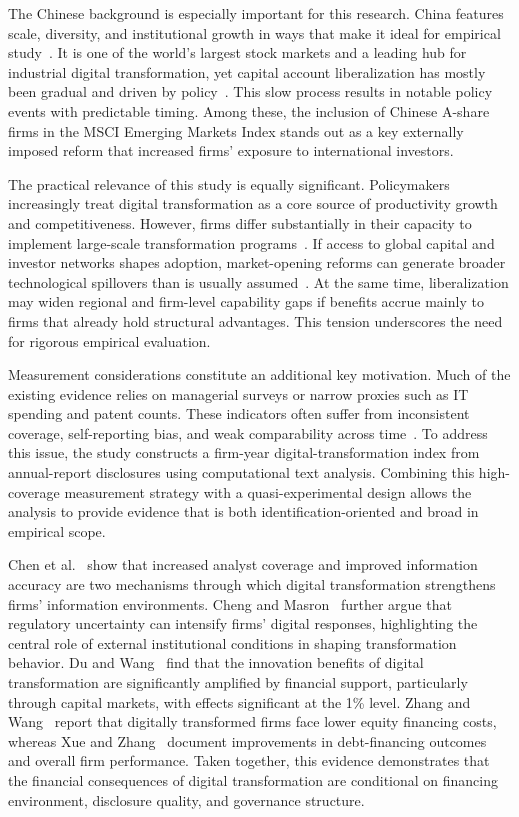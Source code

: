 The Chinese background is especially important for this research. China features scale, diversity, and institutional growth in ways that make it ideal for empirical study~\cite{Allen2017}. It is one of the world's largest stock markets and a leading hub for industrial digital transformation, yet capital account liberalization has mostly been gradual and driven by policy~\cite{PLi2023}. This slow process results in notable policy events with predictable timing. Among these, the inclusion of Chinese A-share firms in the MSCI Emerging Markets Index stands out as a key externally imposed reform that increased firms' exposure to international investors.

The practical relevance of this study is equally significant. Policymakers increasingly treat digital transformation as a core source of productivity growth and competitiveness. However, firms differ substantially in their capacity to implement large-scale transformation programs~\cite{Liu2023}. If access to global capital and investor networks shapes adoption, market-opening reforms can generate broader technological spillovers than is usually assumed~\cite{Zheng2021}. At the same time, liberalization may widen regional and firm-level capability gaps if benefits accrue mainly to firms that already hold structural advantages. This tension underscores the need for rigorous empirical evaluation.

Measurement considerations constitute an additional key motivation. Much of the existing evidence relies on managerial surveys or narrow proxies such as IT spending and patent counts. These indicators often suffer from inconsistent coverage, self-reporting bias, and weak comparability across time~\cite{Wang2022}. To address this issue, the study constructs a firm-year digital-transformation index from annual-report disclosures using computational text analysis. Combining this high-coverage measurement strategy with a quasi-experimental design allows the analysis to provide evidence that is both identification-oriented and broad in empirical scope.

Chen et al.~\cite{Chen2022} show that increased analyst coverage and improved information accuracy are two mechanisms through which digital transformation strengthens firms' information environments. Cheng and Masron~\cite{ChengMasron2023} further argue that regulatory uncertainty can intensify firms' digital responses, highlighting the central role of external institutional conditions in shaping transformation behavior. Du and Wang~\cite{DuWang2024} find that the innovation benefits of digital transformation are significantly amplified by financial support, particularly through capital markets, with effects significant at the 1\% level. Zhang and Wang~\cite{ZhangWang2024} report that digitally transformed firms face lower equity financing costs, whereas Xue and Zhang~\cite{XueZhang2024} document improvements in debt-financing outcomes and overall firm performance. Taken together, this evidence demonstrates that the financial consequences of digital transformation are conditional on financing environment, disclosure quality, and governance structure.

